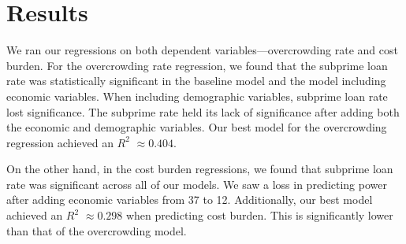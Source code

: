 \documentclass{article}
\begin{document}
\section{Results}


We ran our regressions on both dependent variables---overcrowding rate and cost burden. For the overcrowding rate regression, we found that the subprime loan rate was statistically significant in the baseline model and the model including economic variables. When including demographic variables, subprime loan rate lost significance. The subprime rate held its lack of significance after adding both the economic and demographic variables. Our best model for the overcrowding regression achieved an $R^2$ $\approx 0.404$.

On the other hand, in the cost burden regressions, we found that subprime loan rate was significant across all of our models. We saw a loss in predicting power after adding economic variables from 37 to 12. Additionally, our best model achieved an $R^2$ $\approx 0.298$ when predicting cost burden. This is significantly lower than that of the overcrowding model.
\end{document}
